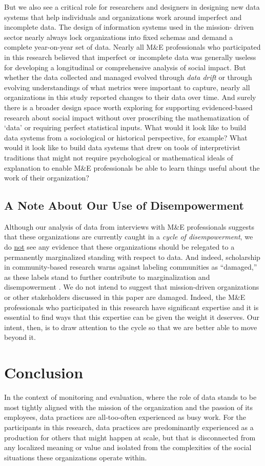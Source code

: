 But we also see a critical role for researchers and designers in designing new data systems that help individuals and organizations work around imperfect and incomplete data. The design of information systems used in the mission- driven sector nearly always lock organizations into fixed schemas and demand a complete year-on-year set of data. Nearly all M\&E professionals who participated in this research believed that imperfect or incomplete data was generally useless for developing a longitudinal or comprehensive analysis of social impact. But whether the data collected and managed evolved through \textit{data drift} or through evolving understandings of what metrics were important to capture, nearly all organizations in this study reported changes to their data over time. And surely there is a broader design space worth exploring for supporting evidenced-based research about social impact without over proscribing the mathematization of ‘data’ or requiring perfect statistical inputs. What would it look like to build data systems from a sociological or historical perspective, for example? What would it look like to build data systems that drew on tools of interpretivist traditions that might not require psychological or mathematical ideals of explanation to enable M\&E professionals be able to learn things useful about the work of their organization?

\subsection{A Note About Our Use of Disempowerment}
Although our analysis of data from interviews with M\&E professionals suggests that these organizations are currently caught in a \textit{cycle of disempowerment}, we do \underline{not} see any evidence that these organizations should be relegated to a permanently marginalized standing with respect to data. And indeed, scholarship in community-based research warns against labeling communities as “damaged,” as these labels stand to further contribute to marginalization and disempowerment \citep{Tuck2009Suspending}. We do not intend to suggest that mission-driven organizations or other stakeholders discussed in this paper are damaged. Indeed, the M\&E professionals who participated in this research have significant expertise and it is essential to find ways that this expertise can be given the weight it deserves. Our intent, then, is to draw attention to the cycle so that we are better able to move beyond it.

\section{Conclusion}
In the context of monitoring and evaluation, where the role of data stands to be most tightly aligned with the mission of the organization and the passion of its employees, data practices are all-too-often experienced as busy work. For the participants in this research, data practices are predominantly experienced as a production for others that might happen at scale, but that is disconnected from any localized meaning or value and isolated from the complexities of the social situations these organizations operate within.

